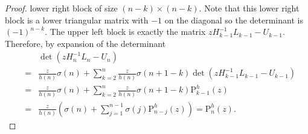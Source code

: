 \documentclass[10pt,a4paper]{amsart}
\newcommand{\pol}{\mathrm{P}}
\begin{document}
\begin{proof}
lower right block of size $\left( n-k\right) \times \left( n-k\right) $.
Note that this lower right
block is a lower triangular matrix with $-1$ on the
diagonal so the determinant is $\left( -1\right) ^{n-k}$. The upper left
block is exactly the matrix $zH_{k-1}^{-1}L_{k-1}-U_{k-1}$. Therefore, by
expansion of the determinant
\begin{eqnarray*}
&&\det \left( zH_{n}^{-1}L_{n}-U_{n}\right) \\
&=&%
\frac{z}{h\left( n\right)
}\sigma \left( n\right)
+\sum _{k=2}^{n}
\frac{z}{h\left( n\right)
}\sigma \left(
n+1-k\right) \det \left( zH_{k-1}^{-1}L_{k-1}-U_{k-1}\right) 
\\
&=&\frac{z}{h\left( n\right)
}\sigma \left( n\right) +\sum _{k=2}^{n}\frac{z}{h\left(
n\right)
}\sigma \left( n+1-k\right) \pol _{k-1}^{h}\left( z\right) \\
&=&\frac{z}{h\left( n\right) }\left( \sigma \left( n\right) +\sum _{j
=1}^{n-1}\sigma \left( j
\right) \pol _{n-j
}^{h}\left( z\right) \right)
=
\pol _{n}^{h}\left( z\right) .
\end{eqnarray*}
\end{proof}
\end{document}
